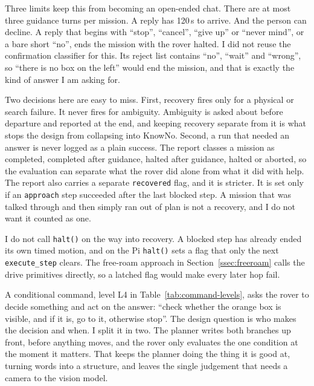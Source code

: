 Three limits keep this from becoming an open-ended chat. There are at most three
guidance turns per mission. A reply has 120\,s to arrive. And the person can
decline. A reply that begins with ``stop'', ``cancel'', ``give up'' or ``never
mind'', or a bare short ``no'', ends the mission with the rover halted. I did not
reuse the confirmation classifier for this. Its reject list contains ``no'',
``wait'' and ``wrong'', so ``there is no box on the left'' would end the mission,
and that is exactly the kind of answer I am asking for.

Two decisions here are easy to miss. First, recovery fires only for a physical or
search failure. It never fires for ambiguity. Ambiguity is asked about before
departure and reported at the end, and keeping recovery separate from it is what
stops the design from collapsing into KnowNo. Second, a run that needed an answer
is never logged as a plain success. The report classes a mission as completed,
completed after guidance, halted after guidance, halted or aborted, so the
evaluation can separate what the rover did alone from what it did with help.
The report also carries a separate \texttt{recovered} flag, and it is stricter. It
is set only if an \texttt{approach} step succeeded after the last blocked step. A
mission that was talked through and then simply ran out of plan is not a
recovery, and I do not want it counted as one.

I do not call \texttt{halt()} on the way into recovery. A blocked step has already
ended its own timed motion, and on the Pi \texttt{halt()} sets a flag that only
the next \texttt{execute\_step} clears. The free-roam approach in
Section~\ref{ssec:freeroam} calls the drive primitives directly, so a latched flag
would make every later hop fail.

\label{sec:conditional}

A conditional command, level L4 in Table~\ref{tab:command-levels}, asks the rover
to decide something and act on the answer: ``check whether the orange box is
visible, and if it is, go to it, otherwise stop''. The design question is who
makes the decision and when. I split it in two. The planner writes both branches
up front, before anything moves, and the rover only evaluates the one condition at
the moment it matters. That keeps the planner doing the thing it is good at,
turning words into a structure, and leaves the single judgement that needs a
camera to the vision model.

